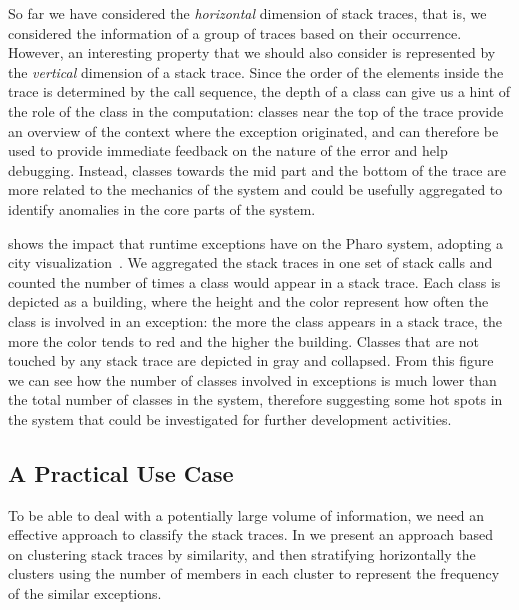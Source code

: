 So far we have considered the \emph{horizontal} dimension of stack traces, that is, we considered the information of a group of traces based on their occurrence.
However, an interesting property that we should also consider is represented by the \emph{vertical} dimension of a stack trace.
Since the order of the elements inside the trace is determined by the call sequence, the depth of a class can give us a hint of the role of the class in the computation: classes near the top of the trace provide an overview of the context where the exception originated, and can therefore be used to provide immediate feedback on the nature of the error and help debugging.
Instead, classes towards the mid part and the bottom of the trace are more related to the mechanics of the system and could be usefully aggregated to identify anomalies in the core parts of the system.

 shows the impact that runtime exceptions have on the Pharo system, adopting a city visualization~\cite{Wett2011a}.
We aggregated the stack traces in one set of stack calls and counted the number of times a class would appear in a stack trace.
Each class is depicted as a building, where the height and the color represent how often the class is involved in an exception: the more the class appears in a stack trace, the more the color tends to red and the higher the building.
Classes that are not touched by any stack trace are depicted in gray and collapsed.
From this figure we can see how the number of classes involved in exceptions is much lower than the total number of classes in the system, therefore suggesting some hot spots in the system that could be investigated for further development activities.

\subsection{A Practical Use Case}

To be able to deal with a potentially large volume of information, we need an effective approach to classify the stack traces.
In  we present an approach based on clustering stack traces by similarity, and then stratifying horizontally the clusters using the number of members in each cluster to represent the frequency of the similar exceptions.

